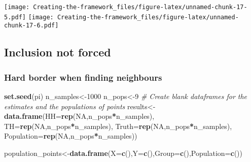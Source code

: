 \documentclass[
]{article}
\newenvironment{Shaded}{\begin{snugshade}}{\end{snugshade}}
\newcommand{\AttributeTok}[1]{\textcolor[rgb]{0.13,0.29,0.53}{#1}}
\newcommand{\CommentTok}[1]{\textcolor[rgb]{0.56,0.35,0.01}{\textit{#1}}}
\newcommand{\ConstantTok}[1]{\textcolor[rgb]{0.56,0.35,0.01}{#1}}
\newcommand{\DecValTok}[1]{\textcolor[rgb]{0.00,0.00,0.81}{#1}}
\newcommand{\FunctionTok}[1]{\textcolor[rgb]{0.13,0.29,0.53}{\textbf{#1}}}
\newcommand{\NormalTok}[1]{#1}
\newcommand{\OtherTok}[1]{\textcolor[rgb]{0.56,0.35,0.01}{#1}}
\newcommand{\SpecialCharTok}[1]{\textcolor[rgb]{0.81,0.36,0.00}{\textbf{#1}}}
\begin{document}
\texttt{[image: Creating-the-framework\_files/figure-latex/unnamed-chunk-17-5.pdf]}
\texttt{[image: Creating-the-framework\_files/figure-latex/unnamed-chunk-17-6.pdf]}

\subsection{Inclusion not forced}\label{inclusion-not-forced}

\subsubsection{Hard border when finding
neighbours}\label{hard-border-when-finding-neighbours}

\begin{Shaded}
\begin{Highlighting}[]
\FunctionTok{set.seed}\NormalTok{(pi)}
\NormalTok{n\_samples}\OtherTok{\textless{}{-}}\DecValTok{1000}
\NormalTok{n\_pops}\OtherTok{\textless{}{-}}\DecValTok{9}
\CommentTok{\# Create blank dataframes for the estimates and the populations of points}
\NormalTok{results}\OtherTok{\textless{}{-}}\FunctionTok{data.frame}\NormalTok{(}\AttributeTok{HH=}\FunctionTok{rep}\NormalTok{(}\ConstantTok{NA}\NormalTok{,n\_pops}\SpecialCharTok{*}\NormalTok{n\_samples),}
                    \AttributeTok{TH=}\FunctionTok{rep}\NormalTok{(}\ConstantTok{NA}\NormalTok{,n\_pops}\SpecialCharTok{*}\NormalTok{n\_samples),}
                    \AttributeTok{Truth=}\FunctionTok{rep}\NormalTok{(}\ConstantTok{NA}\NormalTok{,n\_pops}\SpecialCharTok{*}\NormalTok{n\_samples),}
                    \AttributeTok{Population=}\FunctionTok{rep}\NormalTok{(}\ConstantTok{NA}\NormalTok{,n\_pops}\SpecialCharTok{*}\NormalTok{n\_samples))}

\NormalTok{population\_points}\OtherTok{\textless{}{-}}\FunctionTok{data.frame}\NormalTok{(}\AttributeTok{X=}\FunctionTok{c}\NormalTok{(),}\AttributeTok{Y=}\FunctionTok{c}\NormalTok{(),}\AttributeTok{Group=}\FunctionTok{c}\NormalTok{(),}\AttributeTok{Population=}\FunctionTok{c}\NormalTok{())}


\end{Highlighting}
\end{Shaded}
\end{document}
